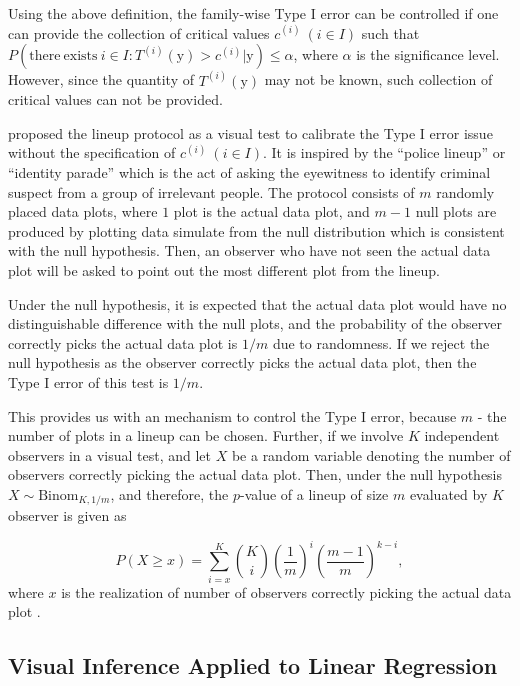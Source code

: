 \documentclass{monashthesis}
\theoremstyle{definition}
\theoremstyle{definition}
\theoremstyle{definition}
\theoremstyle{definition}
\theoremstyle{remark}
\begin{document}
Using the above definition, the family-wise Type I error can be controlled if one can provide the collection of critical values \(c^{(i)}~(i \in I)\) such that \(P(\mathrm{there~exists~} i \in I: T^{(i)}(\boldsymbol{\mathrm{y}}) > c^{(i)}|\boldsymbol{\mathrm{y}}) \leq \alpha\), where \(\alpha\) is the significance level. However, since the quantity of \(T^{(i)}(\boldsymbol{\mathrm{y}})\) may not be known, such collection of critical values can not be provided.

\textcite{buja_statistical_2009} proposed the lineup protocol as a visual test to calibrate the Type I error issue without the specification of \(c^{(i)}~(i \in I)\). It is inspired by the ``police lineup'' or ``identity parade'' which is the act of asking the eyewitness to identify criminal suspect from a group of irrelevant people. The protocol consists of \(m\) randomly placed data plots, where \(1\) plot is the actual data plot, and \(m-1\) null plots are produced by plotting data simulate from the null distribution which is consistent with the null hypothesis. Then, an observer who have not seen the actual data plot will be asked to point out the most different plot from the lineup.

Under the null hypothesis, it is expected that the actual data plot would have no distinguishable difference with the null plots, and the probability of the observer correctly picks the actual data plot is \(1/m\) due to randomness. If we reject the null hypothesis as the observer correctly picks the actual data plot, then the Type I error of this test is \(1/m\).

This provides us with an mechanism to control the Type I error, because \(m\) - the number of plots in a lineup can be chosen. Further, if we involve \(K\) independent observers in a visual test, and let \(X\) be a random variable denoting the number of observers correctly picking the actual data plot. Then, under the null hypothesis \(X \sim \mathrm{Binom}_{K,1/m}\), and therefore, the \(p\)-value of a lineup of size \(m\) evaluated by \(K\) observer is given as

\[P(X \geq x) = \sum_{i=x}^{K}{{K}\choose{i}}\left(\frac{1}{m}\right)^i\left(\frac{m-1}{m}\right)^{k-i},\]
where \(x\) is the realization of number of observers correctly picking the actual data plot \autocite{majumder_validation_2013}.

\hypertarget{visual-inference-applied-to-linear-regression}{%
\subsection{Visual Inference Applied to Linear Regression}\label{visual-inference-applied-to-linear-regression}}
\end{document}
